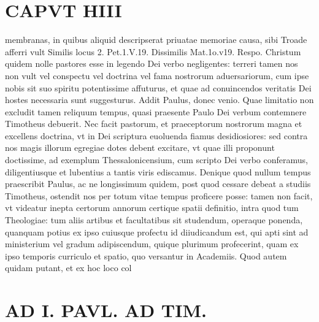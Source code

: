 \documentclass{article}
\begin{document}
\begin{pages}
\section*{CAPVT  HIII }
\marginpar{[ p.233 ]}\pstart membranas, in quibus aliquid descripserat priuatae memoriae causa, sibi Troade afferri vult Similis locus 2. Pet.1.V.19. Dissimilis Mat.1o.v19. Respo. Christum quidem nolle pastores esse in legendo Dei verbo negligentes: terreri tamen nos non vult vel conspectu vel doctrina vel fama nostrorum aduersariorum, cum ipse nobis sit suo spiritu potentissime affuturus, et quae ad conuincendos veritatis Dei hostes necessaria sunt suggesturus. Addit Paulus, donec venio. Quae limitatio non excludit tamen reliquum tempus, quasi praesente Paulo Dei verbum contemnere Timotheus debuerit. Nec facit pastorum, et praeceptorum nostrorum magna et excellens doctrina, vt in Dei scriptura euoluenda fiamus desidiosiores: sed contra nos magis illorum egregiae dotes debent excitare, vt quae illi proponunt doctissime, ad exemplum Thessalonicensium, cum scripto Dei verbo conferamus, diligentiusque et lubentius a tantis viris ediscamus. Denique quod nullum tempus praescribit Paulus, ac ne longissimum quidem, post quod cessare debeat a studiis Timotheus, ostendit nos per totum vitae tempus proficere posse: tamen non facit, vt videatur inepta certorum annorum certique spatii definitio, intra quod tum Theologiae: tum aliis artibus et facultatibus sit studendum, operaque ponenda, quanquam potius ex ipso cuiusque profectu id diiudicandum est, qui apti sint ad ministerium vel gradum adipiscendum, quique plurimum profecerint, quam ex ipso temporis curriculo et spatio, quo versantur in Academiis. Quod autem quidam putant, et ex hoc loco col\pend
\section*{AD I. PAVL. AD TIM. }
\marginpar{[ p.234 ]}\pstart {}
{}

\end{pages}
\end{document}
